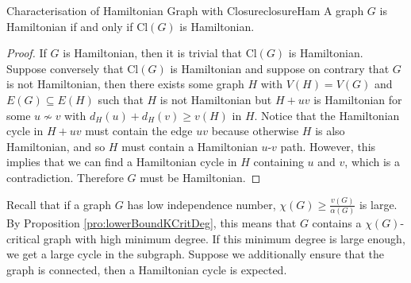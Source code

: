 \documentclass[math]{amznotes}
\theoremstyle{remark}
\begin{document}
\begin{probox}{Characterisation of Hamiltonian Graph with Closure}{closureHam}
    A graph $G$ is Hamiltonian if and only if $\mathrm{Cl}(G)$ is Hamiltonian.
    \tcblower
    \begin{proof}
        If $G$ is Hamiltonian, then it is trivial that $\mathrm{Cl}(G)$ is Hamiltonian. Suppose conversely that $\mathrm{Cl}(G)$ is Hamiltonian and suppose on contrary that $G$ is not Hamiltonian, then there exists some graph $H$ with $V(H) = V(G)$ and $E(G) \subseteq E(H)$ such that $H$ is not Hamiltonian but $H + uv$ is Hamiltonian for some $u \not\sim v$ with $d_H(u) + d_H(v) \geq v(H)$ in $H$. Notice that the Hamiltonian cycle in $H + uv$ must contain the edge $uv$ because otherwise $H$ is also Hamiltonian, and so $H$ must contain a Hamiltonian $u$-$v$ path. However, this implies that we can find a Hamiltonian cycle in $H$ containing $u$ and $v$, which is a contradiction. Therefore $G$ must be Hamiltonian.
    \end{proof}
\end{probox}
Recall that if a graph $G$ has low independence number, $\chi(G) \geq \frac{v(G)}{\alpha(G)}$ is large. By Proposition \ref{pro:lowerBoundKCritDeg}, this means that $G$ contains a $\chi(G)$-critical graph with high minimum degree. If this minimum degree is large enough, we get a large cycle in the subgraph. Suppose we additionally ensure that the graph is connected, then a Hamiltonian cycle is expected.
\end{document}
